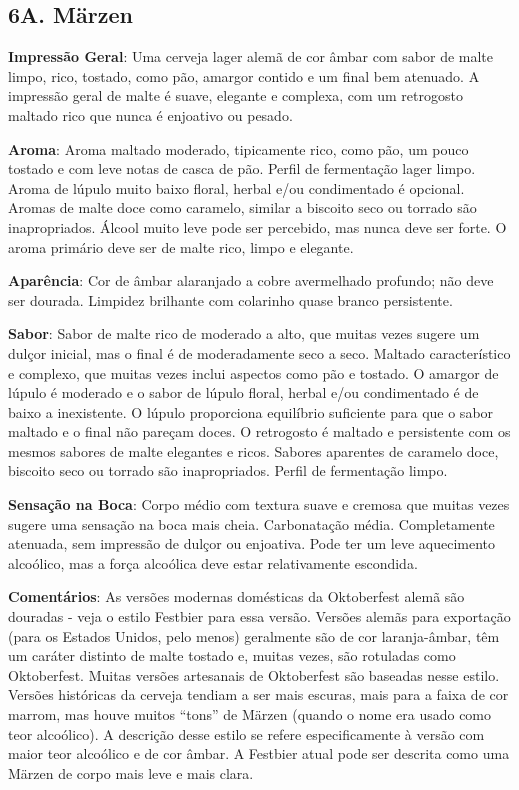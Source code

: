 \subsection*{6A. Märzen}
\textbf{Impressão Geral}: Uma cerveja lager alemã de cor âmbar com sabor de malte limpo, rico, tostado, como pão, amargor contido e um final bem atenuado. A impressão geral de malte é suave, elegante e complexa, com um retrogosto maltado rico que nunca é enjoativo ou pesado.

\textbf{Aroma}: Aroma maltado moderado, tipicamente rico, como pão, um pouco tostado e com leve notas de casca de pão. Perfil de fermentação lager limpo. Aroma de lúpulo muito baixo floral, herbal e/ou condimentado é opcional. Aromas de malte doce como caramelo, similar a biscoito seco ou torrado são inapropriados. Álcool muito leve pode ser percebido, mas nunca deve ser forte. O aroma primário deve ser de malte rico, limpo e elegante.

\textbf{Aparência}: Cor de âmbar alaranjado a cobre avermelhado profundo; não deve ser dourada. Limpidez brilhante com colarinho quase branco persistente.

\textbf{Sabor}: Sabor de malte rico de moderado a alto, que muitas vezes sugere um dulçor inicial, mas o final é de moderadamente seco a seco. Maltado característico e complexo, que muitas vezes inclui aspectos como pão e tostado. O amargor de lúpulo é moderado e o sabor de lúpulo floral, herbal e/ou condimentado é de baixo a inexistente. O lúpulo proporciona equilíbrio suficiente para que o sabor maltado e o final não pareçam doces. O retrogosto é maltado e persistente com os mesmos sabores de malte elegantes e ricos. Sabores aparentes de caramelo doce, biscoito seco ou torrado são inapropriados. Perfil de fermentação limpo.

\textbf{Sensação na Boca}: Corpo médio com textura suave e cremosa que muitas vezes sugere uma sensação na boca mais cheia. Carbonatação média. Completamente atenuada, sem impressão de dulçor ou enjoativa. Pode ter um leve aquecimento alcoólico, mas a força alcoólica deve estar relativamente escondida.

\textbf{Comentários}: As versões modernas domésticas da Oktoberfest alemã são douradas - veja o estilo Festbier para essa versão. Versões alemãs para exportação (para os Estados Unidos, pelo menos) geralmente são de cor laranja-âmbar, têm um caráter distinto de malte tostado e, muitas vezes, são rotuladas como Oktoberfest. Muitas versões artesanais de Oktoberfest são baseadas nesse estilo. Versões históricas da cerveja tendiam a ser mais escuras, mais para a faixa de cor marrom, mas houve muitos “tons” de Märzen (quando o nome era usado como teor alcoólico). A descrição desse estilo se refere especificamente à versão com maior teor alcoólico e de cor âmbar. A Festbier atual pode ser descrita como uma Märzen de corpo mais leve e mais clara.

